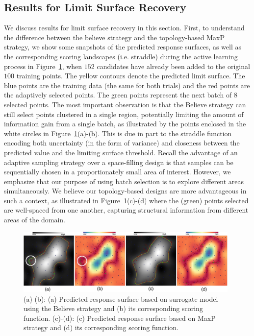 \subsection{Results for Limit Surface Recovery}
\label{sec:limit_results}
We discuss results for limit surface recovery in this section.
%
First, to understand the difference between the believe strategy and the topology-based MaxP strategy, we show some snapshots of the predicted response surfaces, as well as the corresponding scoring landscapes  (i.e. straddle) during the active learning process in Figure~\ref{fig:exampleLimits}, when $152$ candidates have already been added to the original $100$ training points.
%
The yellow contours denote the predicted limit surface.
%
The blue points are the training data (the same for both trials) and the red points are the adaptively selected points.
%
The green points represent the next batch of $8$ selected points.
%
The most important observation is that the Believe strategy can still select points clustered in a single region, potentially limiting the amount of information gain from a single batch, as illustrated by the points enclosed in the white circles in Figure~\ref{fig:exampleLimits}(a)-(b).
%
This is due in part to the straddle function encoding both uncertainty (in the form of variance) and closeness between the predicted value and the limiting surface threshold.
%
Recall the advantage of an adaptive sampling strategy over a space-filling design is that samples can be sequentially chosen in a proportionately small area of interest.
%
However, we emphasize that our purpose of using batch selection is to explore different areas simultaneously.
%
We believe our topology-based designs are more advantageous in such a context, as illustrated in Figure~\ref{fig:exampleLimits}(c)-(d) where the (green) points selected are well-spaced from one another, capturing structural information from different areas of the domain.

\begin{figure}[!ht]
\centering
\includegraphics[width=0.98\textwidth]{figs/chap5/example-limits}
\caption{(a)-(b): (a) Predicted response surface based on surrogate model using
the Believe strategy and (b) its corresponding scoring function.
%
(c)-(d): (c) Predicted response surface based on MaxP strategy and (d) its
corresponding scoring function.}
\label{fig:exampleLimits}
\end{figure}


